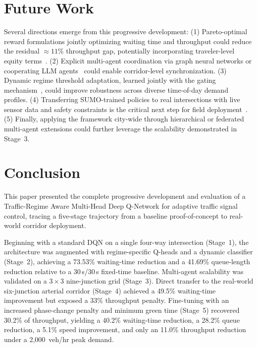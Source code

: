 \documentclass[lettersize,journal]{IEEEtran}
\begin{document}
\section{Future Work}
\label{sec:future}

Several directions emerge from this progressive development: (1) Pareto-optimal reward formulations jointly optimizing waiting time and throughput could reduce the residual $\approx\!11\%$ throughput gap, potentially incorporating traveler-level equity terms~\cite{zhang2026equity}. (2) Explicit multi-agent coordination via graph neural networks or cooperating LLM agents~\cite{wei2019colight,yuan2025collmlight} could enable corridor-level synchronization. (3) Dynamic regime threshold adaptation, learned jointly with the gating mechanism~\cite{yao2025moesac}, could improve robustness across diverse time-of-day demand profiles. (4) Transferring SUMO-trained policies to real intersections with live sensor data and safety constraints is the critical next step for field deployment~\cite{chen2022realdeal,mei2023libsignal}. (5) Finally, applying the framework city-wide through hierarchical or federated multi-agent extensions could further leverage the scalability demonstrated in Stage~3.

\section{Conclusion}
\label{sec:conclusion}

This paper presented the complete progressive development and evaluation of
a Traffic-Regime Aware Multi-Head Deep Q-Network for adaptive traffic
signal control, tracing a five-stage trajectory from a baseline
proof-of-concept to real-world corridor deployment.

Beginning with a standard DQN on a single four-way intersection (Stage~1),
the architecture was augmented with regime-specific Q-heads and a dynamic
classifier (Stage~2), achieving a 73.53\% waiting-time reduction and a
41.69\% queue-length reduction relative to a 30\,s/30\,s fixed-time
baseline. Multi-agent scalability was validated on a $3\times3$
nine-junction grid (Stage~3). Direct transfer to the real-world
six-junction arterial corridor (Stage~4) achieved a 49.5\% waiting-time
improvement but exposed a 33\% throughput penalty. Fine-tuning with an
increased phase-change penalty and minimum green time (Stage~5) recovered
30.2\% of throughput, yielding a 40.2\% waiting-time reduction, a 28.2\%
queue reduction, a 5.1\% speed improvement, and only an 11.0\% throughput
reduction under a 2{,}000~veh/hr peak demand.
\end{document}
